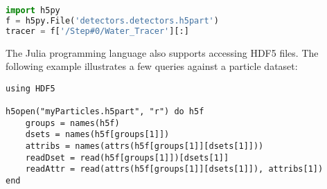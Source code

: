 \begin{lstlisting}[language=python]
import h5py
f = h5py.File('detectors.detectors.h5part')
tracer = f['/Step#0/Water_Tracer'][:]
\end{lstlisting}

The Julia programming language also supports accessing HDF5 files. The following example illustrates a few queries against a particle dataset:

\begin{lstlisting}
using HDF5

h5open("myParticles.h5part", "r") do h5f
    groups = names(h5f)
    dsets = names(h5f[groups[1]])
    attribs = names(attrs(h5f[groups[1]][dsets[1]]))
    readDset = read(h5f[groups[1]])[dsets[1]]
    readAttr = read(attrs(h5f[groups[1]][dsets[1]]), attribs[1])
end
\end{lstlisting}
